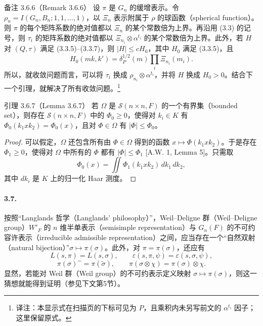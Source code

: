 \begin{originaltheorem}{备注 3.6.6（Remark 3.6.6）}
设 $\pi$ 是 $G_n$ 的缓增表示。令 $\rho_n=I(G_n,B_n;1,1,\ldots,1)$，以 $\Xi_n$ 表示附属于 $\rho$ 的球函数（spherical function）。则 $\pi$ 的每个矩阵系数的绝对值都以 $\Xi_n$ 的某个常数倍为上界。再沿用 (3.3) 的记号，则 $\tau_i$ 的矩阵系数的绝对值都以 $\Xi_{n_i}\otimes\alpha^{t_i}$ 的某个常数倍为上界。此外，若 $H$ 对 $(Q,\tau)$ 满足 (3.3.5)--(3.3.7)，则 $|H|\leq cH_0$，其中 $H_0$ 满足 (3.3.5)，且
\[
H_0(mk,k')=\delta_P^{1/2}(m)\prod_i\Xi_{n_i}(m_i).
\]
所以，就收敛问题而言，可以将 $\tau_i$ 换成 $\rho_{n_i}\otimes\alpha^{t_i}$，并将 $H$ 换成 $H_0>0$。结合下一个引理，就解决了所有收敛问题。\footnote{译注：本显示式在扫描页的下标可见为 $P$，且乘积内未另写前文的 $\alpha^{t_i}$ 因子；这里保留原式。}
\end{originaltheorem}

\begin{originaltheorem}{引理 3.6.7（Lemma 3.6.7）}
若 $\Omega$ 是 $\mathcal S(n\times n,F)$ 的一个有界集（bounded set），则存在 $\mathcal S(n\times n,F)$ 中的 $\Phi_0\geq0$，使得对 $k_i\in K$ 有 $\Phi_0(k_1xk_2)=\Phi_0(x)$，且对 $\Phi\in\Omega$ 有 $|\Phi|\leq\Phi_0$。
\end{originaltheorem}
\begin{proof}
可以假定，$\Omega$ 还包含所有由 $\Phi\in\Omega$ 得到的函数 $x\mapsto\Phi(k_1xk_2)$。于是存在 $\Phi_1\geq0$，使得对 $\Omega$ 中所有的 $\Phi$ 都有 $|\Phi|\leq\Phi_1$ [A.W. 1, Lemma 5]。只需取
\[
\Phi_0(x)=\iint\Phi_1(k_1xk_2)\,dk_1\,dk_2,
\]
其中 $dk_i$ 是 $K$ 上的归一化 Haar 测度。
\end{proof}

\paragraph*{3.7.}
按照“Langlands 哲学（Langlands' philosophy）”，Weil--Deligne 群（Weil--Deligne group）$W'_F$ 的 $n$ 维半单表示（semisimple representation）与 $G_n(F)$ 的不可约容许表示（irreducible admissible representation）之间，应当存在一个“自然双射（natural bijection）”$\sigma\mapsto\pi(\sigma)$。此外，对 $\pi=\pi(\sigma)$，还应有
\[
L(s,\pi)=L(s,\sigma),\qquad
\varepsilon(s,\pi,\psi)=\varepsilon(s,\sigma,\psi),
\]
\[
\pi(\sigma)^\sim=\pi(\widetilde\sigma),\qquad
\pi(\sigma\otimes\chi)=\pi(\sigma)\otimes\chi.
\]
显然，若能对 Weil 群（Weil group）的不可约表示定义映射 $\sigma\mapsto\pi(\sigma)$，则这一猜想就能得到证明（参见下文第5节）。

